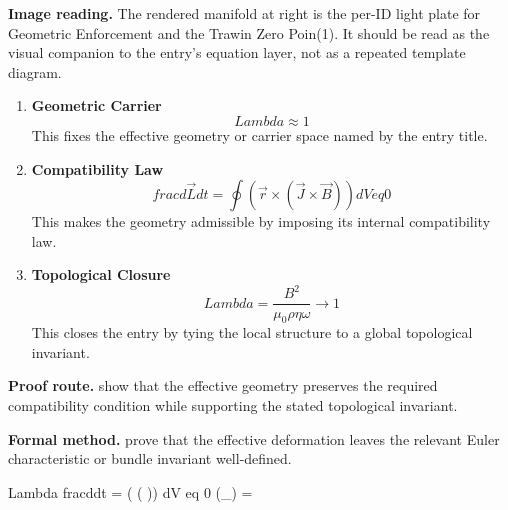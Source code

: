 \begin{samepage}
\noindent\begin{minipage}[t]{0.45\linewidth}
\vspace{0pt}
\raggedright
\scriptsize\textbf{Image reading.} The rendered manifold at right is the per-ID light plate for Geometric Enforcement and the Trawin Zero Poin(1). It should be read as the visual companion to the entry's equation layer, not as a repeated template diagram.\par
\end{minipage}\hfill
\begin{minipage}[t]{0.53\linewidth}
\vspace*{-0.10in}
\raggedright
{}
\end{minipage}
\end{samepage}

\clearpage


\begin{enumerate}[leftmargin=1.6em,itemsep=9pt,topsep=6pt]
\item \textbf{Geometric Carrier}
\[
Lambda \approx 1
\]
This fixes the effective geometry or carrier space named by the entry title.

\item \textbf{Compatibility Law}
\[
frac{d\vec{L}}{dt} = \oint (\vec{r} \times (\vec{J} \times \vec{B})) dV  eq 0
\]
This makes the geometry admissible by imposing its internal compatibility law.

\item \textbf{Topological Closure}
\[
Lambda = \frac{B^2}{\mu_0 \rho \eta \omega} \to 1
\]
This closes the entry by tying the local structure to a global topological invariant.
\end{enumerate}

\textbf{Proof route.} show that the effective geometry preserves the required compatibility condition while supporting the stated topological invariant.

\textbf{Formal method.} prove that the effective deformation leaves the relevant Euler characteristic or bundle invariant well-defined.

\medskip
{}

\begin{tzpsnapshot}
\end{tzpsnapshot}

\tzpequationlinks
  {Lambda }
  {frac{d}{dt} = \oint ( \times ( \times {})) dV  eq 0}
  {\chi(_{}) = \cdots}
